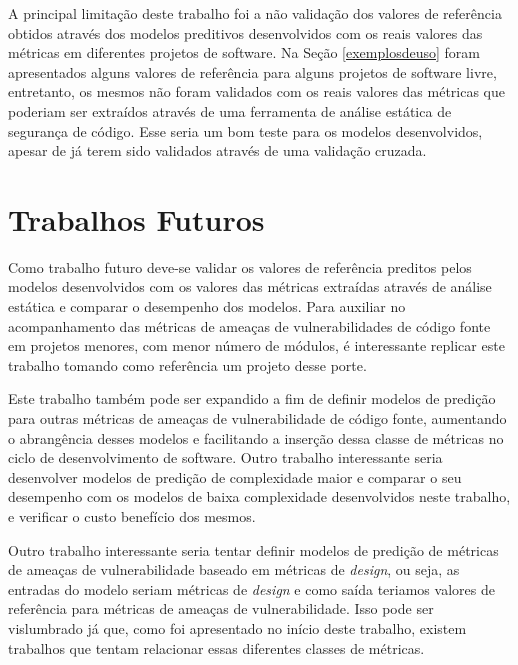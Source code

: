 A principal limitação deste trabalho foi a não validação dos valores de
referência obtidos através dos modelos preditivos desenvolvidos com os reais
valores das métricas em diferentes projetos de software. Na Seção
\ref{exemplosdeuso} foram apresentados alguns valores de referência para alguns
projetos de software livre, entretanto, os mesmos não foram validados com os
reais valores das métricas que poderiam ser extraídos através de uma ferramenta
de análise estática de segurança de código. Esse seria um bom teste para os
modelos desenvolvidos, apesar de já terem sido validados através de uma
validação cruzada.

\section{Trabalhos Futuros}

Como trabalho futuro deve-se validar os valores de referência preditos pelos
modelos desenvolvidos com os valores das métricas extraídas através de análise
estática e comparar o desempenho dos modelos. Para auxiliar no acompanhamento
das métricas de ameaças de vulnerabilidades de código fonte em projetos menores,
com menor número de módulos, é interessante replicar este trabalho tomando como
referência um projeto desse porte.

Este trabalho também pode ser expandido a fim de definir modelos de predição
para outras métricas de ameaças de vulnerabilidade de código fonte, aumentando o
abrangência desses modelos e facilitando a inserção dessa classe de métricas no
ciclo de desenvolvimento de software. Outro trabalho interessante seria
desenvolver modelos de predição de complexidade maior e comparar o seu
desempenho com os modelos de baixa complexidade desenvolvidos neste trabalho, e
verificar o custo benefício dos mesmos.

Outro trabalho interessante seria tentar definir modelos de predição de métricas de
ameaças de vulnerabilidade baseado em métricas de \textit{design}, ou seja, as
entradas do modelo seriam métricas de \textit{design} e como saída teriamos
valores de referência para métricas de ameaças de vulnerabilidade. Isso pode ser
vislumbrado já que, como foi apresentado no início deste trabalho, existem
trabalhos que tentam relacionar essas diferentes classes de métricas.

